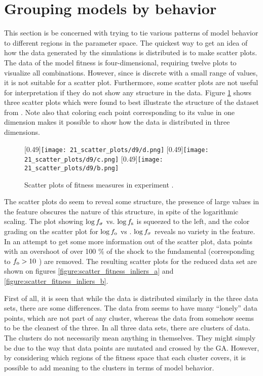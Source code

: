 \section{Grouping models by behavior}
This section is be concerned with trying to tie various patterns of model behavior to different regions in the parameter space. The quickest way to get an idea of how the data generated by the simulations is distributed is to make scatter plots. The data of the model fitness is four-dimensional, requiring twelve plots to visualize all combinations. However, since \overshoot is discrete with a small range of values, it is not suitable for a scatter plot. Furthermore, some scatter plots are not useful for interpretation if they do not show any structure in the data. Figure \ref{figure:d9_scatter_fitness} shows three scatter plots which were found to best illustrate the structure of the dataset from \dnine. Note also that coloring each point corresponding to its value in one dimension makes it possible to show how the data is distributed in three dimensions.
\begin{figure}
\centering
{}
[0.49\linewidth]{\texttt{[image: 21\_scatter\_plots/d9/d.png]}}
[0.49\linewidth]{\texttt{[image: 21\_scatter\_plots/d9/c.png]}}
[0.49\linewidth]{\texttt{[image: 21\_scatter\_plots/d9/b.png]}}
\caption{Scatter plots of fitness measures in experiment \dnine. }
\label{figure:d9_scatter_fitness}
\end{figure}
The scatter plots do seem to reveal some structure, the presence of large values in the \stdev feature obscures the nature of this structure, in spite of the logarithmic scaling. The plot showing $\log f_\sigma$ vs. $\log f_\text{s}$ is squeezed to the left, and the color grading on the scatter plot for $\log f_\text{o}$ vs . $\log f_\sigma$ reveals no variety in the \stdev feature. In an attempt to get some more information out of the scatter plot, data points with an overshoot of over 100 \% of the shock to the fundamental (corresponding to $f_\text{o} > 10$ ) are removed. The resulting scatter plots for the reduced data set are shown on figures \ref{figure:scatter_fitness_inliers_a} and \ref{figure:scatter_fitness_inliers_b}.

First of all, it is seen that while the data is distributed similarly in the three data sets, there are some differences. The data from \dnine{} seems to have many ``lonely'' data points, which are not part of any cluster, whereas the data from \dten{} somehow seems to be the cleanest of the three. In all three data sets, there are clusters of data. The clusters do not necessarily mean anything in themselves. They might simply be due to the way that data points are mutated and crossed by the GA. However, by considering which regions of the fitness space that each cluster covers, it is possible to add meaning to the clusters in terms of model behavior.

